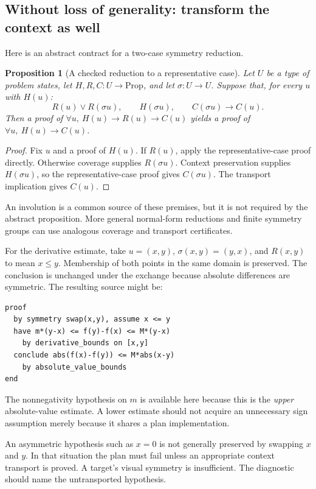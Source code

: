 \documentclass[11pt,a4paper]{article}
\newtheorem{proposition}[theorem]{Proposition}
\theoremstyle{definition}
\theoremstyle{remark}
\numberwithin{equation}{section}
\begin{document}
\subsection{Without loss of generality: transform the context as well}
\label{sec:wlog}
Here is an abstract contract for a two-case symmetry reduction.
\begin{proposition}[A checked reduction to a representative case]
\label{prop:wlog}
Let $U$ be a type of problem states, let $H,R,C:U\to\mathrm{Prop}$, and let $\sigma:U\to U$. Suppose that, for every $u$ with $H(u)$:
\[
 R(u)\lor R(\sigma u),\qquad H(\sigma u),\qquad C(\sigma u)\to C(u).
\]
Then a proof of $\forall u,\ H(u)\to R(u)\to C(u)$ yields a proof of $\forall u,\ H(u)\to C(u)$.
\end{proposition}
\begin{proof}
Fix $u$ and a proof of $H(u)$. If $R(u)$, apply the representative-case proof directly. Otherwise coverage supplies $R(\sigma u)$. Context preservation supplies $H(\sigma u)$, so the representative-case proof gives $C(\sigma u)$. The transport implication gives $C(u)$.
\end{proof}
An involution is a common source of these premises, but it is not required by the abstract proposition. More general normal-form reductions and finite symmetry groups can use analogous coverage and transport certificates.

For the derivative estimate, take $u=(x,y)$, $\sigma(x,y)=(y,x)$, and $R(x,y)$ to mean $x\le y$. Membership of both points in the same domain is preserved. The conclusion is unchanged under the exchange because absolute differences are symmetric. The resulting source might be:
\begin{lstlisting}
proof
  by symmetry swap(x,y), assume x <= y
  have m*(y-x) <= f(y)-f(x) <= M*(y-x)
    by derivative_bounds on [x,y]
  conclude abs(f(x)-f(y)) <= M*abs(x-y)
    by absolute_value_bounds
end
\end{lstlisting}
The nonnegativity hypothesis on $m$ is available here because this is the \emph{upper} absolute-value estimate. A lower estimate should not acquire an unnecessary sign assumption merely because it shares a plan implementation.

An asymmetric hypothesis such as $x=0$ is not generally preserved by swapping $x$ and $y$. In that situation the plan must fail unless an appropriate context transport is proved. A target's visual symmetry is insufficient. The diagnostic should name the untransported hypothesis.
\end{document}
